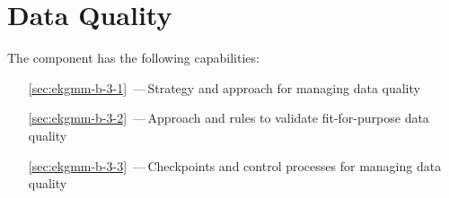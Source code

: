 \chapter{Data Quality}\label{ch:ekg-mm-b-3} %

The  component has the following capabilities:

\begin{itemize}[leftmargin=.5in]
  \item [\ref{sec:ekgmm-b-3-1}] \,---\,Strategy and approach for managing data quality
  \item [\ref{sec:ekgmm-b-3-2}] \,---\,Approach and rules to validate fit-for-purpose data quality
  \item [\ref{sec:ekgmm-b-3-3}] \,---\,Checkpoints and control processes for managing data quality
\end{itemize}




